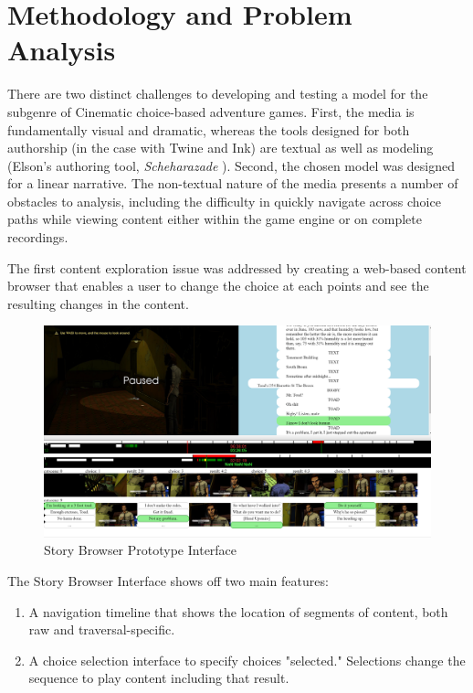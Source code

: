 \documentclass[10pt]{article}
\begin{document}
\section{Methodology and Problem Analysis}
\label{sec:orgheadline4}
There are two distinct challenges to developing and testing a model
for the subgenre of Cinematic choice-based adventure games. First, the
media is fundamentally visual and dramatic, whereas the tools designed
for both authorship (in the case with Twine and Ink) are textual as
well as modeling (Elson's authoring tool, \emph{Scheharazade}
\cite{Elson2012}). Second, the chosen model was designed for a linear
narrative. The non-textual nature of the media presents a number of
obstacles to analysis, including the difficulty in quickly navigate
across choice paths while viewing content either within the game
engine or on complete recordings. 

The first content exploration issue was addressed by creating a
web-based content browser that enables a user to change the choice at
each points and see the resulting changes in the content.

\begin{figure}[htb]
\centering
\includegraphics[width=.9\linewidth]{story_browser.png}
\caption{Story Browser Prototype Interface}
\end{figure}

The Story Browser Interface shows off two main features: 

\begin{enumerate}
\item A navigation timeline that shows the location of segments of
content, both raw and traversal-specific.
\item A choice selection interface to specify choices "selected."
Selections change the sequence to play content including that
result.
\end{enumerate}
\end{document}
